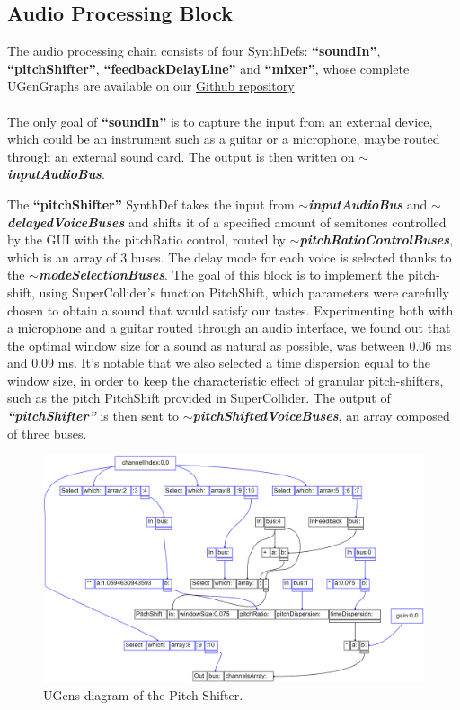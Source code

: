 \documentclass{article}
\begin{document}
\subsection{Audio Processing Block}

The audio processing chain consists of four SynthDefs: \textbf{“soundIn”}, \textbf{“pitchShifter”}, \textbf{“feedbackDelayLine”} and \textbf{“mixer”}, whose complete UGenGraphs are available on our \href{http://www.latex-tutorial.com}{Github repository} \\
\\The only goal of \textbf{“soundIn”} is to capture the input from an external device, which could be an instrument such as a guitar or a microphone, maybe routed through an external sound card. The output is then written on \textbf{\textit{$\sim$inputAudioBus}}.

The \textbf{“pitchShifter”} SynthDef takes the input from \textbf{\textit{$\sim$inputAudioBus}} and  \textbf{\textit{$\sim$delayedVoiceBuses}} and shifts it of a specified amount of semitones controlled by the GUI with the pitchRatio control, routed by \textbf{\textit{$\sim$pitchRatioControlBuses}}, which is an array of 3 buses.  The delay mode for each voice is selected thanks to the \textbf{\textit{$\sim$modeSelectionBuses}}. The goal of this block is to implement the pitch-shift, using SuperCollider’s function PitchShift, which parameters were carefully chosen to obtain a sound that would satisfy our tastes. Experimenting both with a microphone and a guitar routed through an audio interface, we found out that the optimal window size for a sound as natural as possible, was between 0.06 ms and 0.09 ms. It’s notable that we also selected a time dispersion equal to the window size, in order to keep the characteristic effect of granular pitch-shifters, such as the pitch PitchShift provided in SuperCollider. The output of \textbf{\textit{“pitchShifter”}} is then sent to \textbf{\textit{$\sim$pitchShiftedVoiceBuses}}, an array composed of three buses.

\begin{figure}[H]   
  \includegraphics[width=1
  \textwidth]{UGensPitchShifter.png}
  \centering
\caption{UGens diagram of the Pitch Shifter.}
\end{figure}
\end{document}
